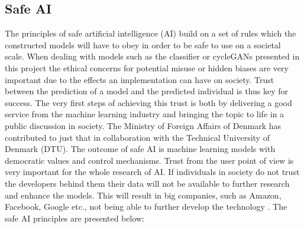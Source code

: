 \documentclass[12pt, fleqn, titlepage]{article}
\begin{document}
\subsection{Safe AI}

The principles of safe artificial intelligence (AI) build on a set of rules which the constructed models will have to obey in order to be safe to use on a societal scale. When dealing with models such as the classifier or cycleGANs presented in this project the ethical concerns for potential misuse or hidden biases are very important due to the effects an implementation can have on society. Trust between the prediction of a model and the predicted individual is thus key for success. The very first steps of achieving this trust is both by delivering a good service from the machine learning industry and bringing the topic to life in a public discussion in society. The Ministry of Foreign Affairs of Denmark has contributed to just that in collaboration with the Technical University of Denmark (DTU). The outcome of safe AI is machine learning models with democratic values and control mechanisms. Trust from the user point of view is very important for the whole research of AI. If individuals in society do not trust the developers behind them their data will not be available to further research and enhance the models. This will result in big companies, such as Amazon, Facebook, Google etc., not being able to further develop the technology \cite{larsk}. The safe AI principles are presented below:
\end{document}
